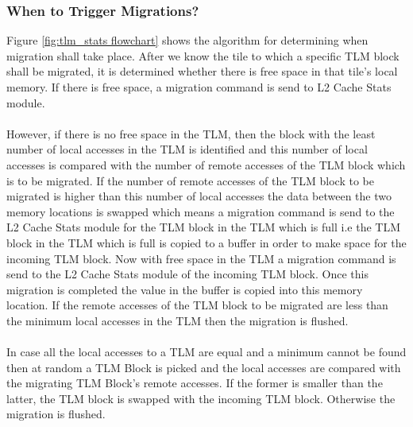 \documentclass{listhesis}
\begin{document}
\subsubsection{When to Trigger Migrations?}
Figure \ref{fig:tlm_stats flowchart} shows the algorithm for determining when migration shall take place. After we know the tile to which a specific TLM block shall be migrated, it is determined whether there is free space in that tile's local memory. If there is free space, a migration command is send to L2 Cache Stats module. \\
\\
However, if there is no free space in the TLM, then the block with the least number of local accesses in the TLM is identified and this number of local accesses is compared with the number of remote accesses of the TLM block which is to be migrated. If the number of remote accesses of the TLM block to be migrated is higher than this number of local accesses the data between the two memory locations is swapped which means a migration command is send to the L2 Cache Stats module for the TLM block in the TLM which is full i.e the TLM block in the TLM which is full is copied to a buffer in order to make space for the incoming TLM block. Now with free space in the TLM a migration command is send to the L2 Cache Stats module of the incoming TLM block. Once this migration is completed the value in the buffer is copied into this memory location. If the remote accesses of the TLM block to be migrated are less than the minimum local accesses in the TLM then the migration is flushed.\\
\\
In case all the local accesses to a TLM are equal and a minimum cannot be found then at random a TLM Block is picked and the local accesses are compared with the migrating TLM Block's remote accesses. If the former is smaller than the latter, the TLM block is swapped with the incoming TLM block. Otherwise the migration is flushed.\\
\end{document}
